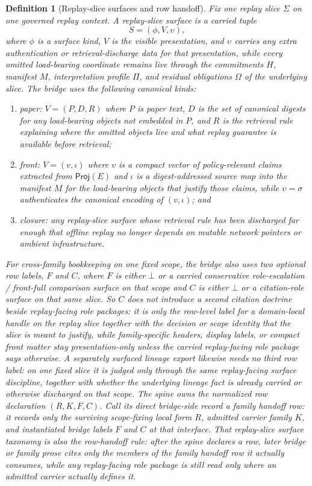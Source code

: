 \documentclass[11pt]{article}
\newtheorem{definition}{Definition}
\newcommand{\Proj}{\mathsf{Proj}}
\begin{document}
\begin{definition}[Replay-slice surfaces and row handoff]
Fix one replay slice $\Sigma$ on one governed replay context.
A \emph{replay-slice surface} is a carried tuple
\[
S=(\phi,V,\upsilon),
\]
where $\phi$ is a surface kind, $V$ is the visible presentation, and $\upsilon$ carries any extra authentication or retrieval-discharge data for that presentation, while every omitted load-bearing coordinate remains live through the commitments $H$, manifest $M$, interpretation profile $\Pi$, and residual obligations $\Omega$ of the underlying slice.
The bridge uses the following canonical kinds:
\begin{enumerate}[leftmargin=*]
  \item \emph{paper}: $V=(P,D,R)$ where $P$ is paper text, $D$ is the set of canonical digests for any load-bearing objects not embedded in $P$, and $R$ is the retrieval rule explaining where the omitted objects live and what replay guarantee is available before retrieval;
  \item \emph{front}: $V=(v,\iota)$ where $v$ is a compact vector of policy-relevant claims extracted from $\Proj(E)$ and $\iota$ is a digest-addressed source map into the manifest $M$ for the load-bearing objects that justify those claims, while $\upsilon=\sigma$ authenticates the canonical encoding of $(v,\iota)$; and
  \item \emph{closure}: any replay-slice surface whose retrieval rule has been discharged far enough that offline replay no longer depends on mutable network pointers or ambient infrastructure.
\end{enumerate}
For cross-family bookkeeping on one fixed scope, the bridge also uses two optional row labels, $F$ and $C$, where $F$ is either $\bot$ or a carried conservative role-escalation / front-full comparison surface on that scope and $C$ is either $\bot$ or a citation-role surface on that same slice.
So $C$ does not introduce a second citation doctrine beside replay-facing role packages: it is only the row-level label for a domain-local handle on the replay slice together with the decision or scope identity that the slice is meant to justify, while family-specific headers, display labels, or compact front matter stay presentation-only unless the carried replay-facing role package says otherwise.
A separately surfaced lineage export likewise needs no third row label: on one fixed slice it is judged only through the same replay-facing surface discipline, together with whether the underlying lineage fact is already carried or otherwise discharged on that scope.
The spine owns the normalized row declaration $(R,K,F,C)$.
Call its direct bridge-side record a \emph{family handoff row}: it records only the surviving scope-fixing local form $R$, admitted carrier family $K$, and instantiated bridge labels $F$ and $C$ at that interface.
That replay-slice surface taxonomy is also the row-handoff rule: after the spine declares a row, later bridge or family prose cites only the members of the family handoff row it actually consumes, while any replay-facing role package is still read only where an admitted carrier actually defines it.
\end{definition}
\end{document}
